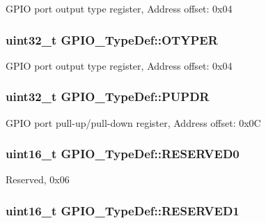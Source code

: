 G\-P\-I\-O port output type register, Address offset\-: 0x04 \hypertarget{struct_g_p_i_o___type_def_a910885e4d881c3a459dd11640237107f}{
\subsubsection[{O\-T\-Y\-P\-E\-R}]{ uint32\-\_\-t G\-P\-I\-O\-\_\-\-Type\-Def\-::\-O\-T\-Y\-P\-E\-R}}\label{struct_g_p_i_o___type_def_a910885e4d881c3a459dd11640237107f}
G\-P\-I\-O port output type register, Address offset\-: 0x04 \hypertarget{struct_g_p_i_o___type_def_a44ada3bfbe891e2efc1e06bda4c8014e}{
\subsubsection[{P\-U\-P\-D\-R}]{ uint32\-\_\-t G\-P\-I\-O\-\_\-\-Type\-Def\-::\-P\-U\-P\-D\-R}}\label{struct_g_p_i_o___type_def_a44ada3bfbe891e2efc1e06bda4c8014e}
G\-P\-I\-O port pull-\/up/pull-\/down register, Address offset\-: 0x0\-C \hypertarget{struct_g_p_i_o___type_def_a23e4eb7429215d8513434000a04fc264}{
\subsubsection[{R\-E\-S\-E\-R\-V\-E\-D0}]{\setlength{\rightskip}{0pt plus 5cm}uint16\-\_\-t G\-P\-I\-O\-\_\-\-Type\-Def\-::\-R\-E\-S\-E\-R\-V\-E\-D0}}\label{struct_g_p_i_o___type_def_a23e4eb7429215d8513434000a04fc264}
Reserved, 0x06 \hypertarget{struct_g_p_i_o___type_def_a6873e6635592f8ecd30ad73fe3301225}{
\subsubsection[{R\-E\-S\-E\-R\-V\-E\-D1}]{\setlength{\rightskip}{0pt plus 5cm}uint16\-\_\-t G\-P\-I\-O\-\_\-\-Type\-Def\-::\-R\-E\-S\-E\-R\-V\-E\-D1}}\label{struct_g_p_i_o___type_def_a6873e6635592f8ecd30ad73fe3301225}
